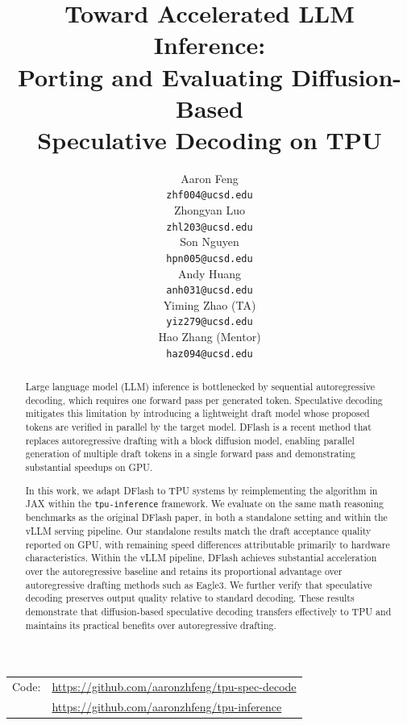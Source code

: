 \documentclass[12pt,letterpaper]{article}
\title{
Toward Accelerated LLM Inference:\\
Porting and Evaluating Diffusion-Based\\
Speculative Decoding on TPU
}
\author{Aaron Feng \\
  {\tt zhf004@ucsd.edu} \\\And
  Zhongyan Luo \\
  {\tt zhl203@ucsd.edu} \\\And
  Son Nguyen \\
  {\tt hpn005@ucsd.edu} \\\And
  Andy Huang \\
  {\tt anh031@ucsd.edu} \\\AND
  Yiming Zhao (TA) \\
  {\tt yiz279@ucsd.edu} \\\And
  Hao Zhang (Mentor) \\
  {\tt haz094@ucsd.edu} \\}
\begin{document}
\maketitle


\begin{abstract}
Large language model (LLM) inference is bottlenecked by sequential autoregressive decoding, which requires one forward pass per generated token. Speculative decoding mitigates this limitation by introducing a lightweight draft model whose proposed tokens are verified in parallel by the target model. DFlash is a recent method that replaces autoregressive drafting with a block diffusion model, enabling parallel generation of multiple draft tokens in a single forward pass and demonstrating substantial speedups on GPU.

In this work, we adapt DFlash to TPU systems by reimplementing the algorithm in JAX within the \texttt{tpu-inference} framework. We evaluate on the same math reasoning benchmarks as the original DFlash paper, in both a standalone setting and within the vLLM serving pipeline. Our standalone results match the draft acceptance quality reported on GPU, with remaining speed differences attributable primarily to hardware characteristics. Within the vLLM pipeline, DFlash achieves substantial acceleration over the autoregressive baseline and retains its proportional advantage over autoregressive drafting methods such as Eagle3. We further verify that speculative decoding preserves output quality relative to standard decoding. These results demonstrate that diffusion-based speculative decoding transfers effectively to TPU and maintains its practical benefits over autoregressive drafting.
\end{abstract}

\begin{center}
\begin{tabular}{r l}
Code: & \url{https://github.com/aaronzhfeng/tpu-spec-decode} \\
      & \url{https://github.com/aaronzhfeng/tpu-inference}
\end{tabular}
\end{center}


\clearpage

\maketoc
\clearpage

\end{document}
